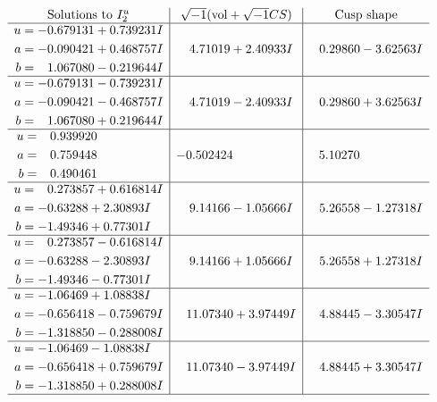 \documentclass[1p]{elsarticle_modified}
\theoremstyle{definition}
\newcommand{\I}{\sqrt{-1}}
\begin{document}
$$\begin{array}{c|c|c}  
\text{Solutions to }I^u_{2}& \I (\text{vol} + \sqrt{-1}CS) & \text{Cusp shape}\\
 \hline 
\begin{aligned}
u &= -0.679131 + 0.739231 I \\
a &= -0.090421 + 0.468757 I \\
b &= \phantom{-}1.067080 - 0.219644 I\end{aligned}
 & \phantom{-}4.71019 + 2.40933 I & \phantom{-}0.29860 - 3.62563 I \\ \hline\begin{aligned}
u &= -0.679131 - 0.739231 I \\
a &= -0.090421 - 0.468757 I \\
b &= \phantom{-}1.067080 + 0.219644 I\end{aligned}
 & \phantom{-}4.71019 - 2.40933 I & \phantom{-}0.29860 + 3.62563 I \\ \hline\begin{aligned}
u &= \phantom{-}0.939920\phantom{ +0.000000I} \\
a &= \phantom{-}0.759448\phantom{ +0.000000I} \\
b &= \phantom{-}0.490461\phantom{ +0.000000I}\end{aligned}
 & -0.502424\phantom{ +0.000000I} & \phantom{-}5.10270\phantom{ +0.000000I} \\ \hline\begin{aligned}
u &= \phantom{-}0.273857 + 0.616814 I \\
a &= -0.63288 + 2.30893 I \\
b &= -1.49346 + 0.77301 I\end{aligned}
 & \phantom{-}9.14166 - 1.05666 I & \phantom{-}5.26558 - 1.27318 I \\ \hline\begin{aligned}
u &= \phantom{-}0.273857 - 0.616814 I \\
a &= -0.63288 - 2.30893 I \\
b &= -1.49346 - 0.77301 I\end{aligned}
 & \phantom{-}9.14166 + 1.05666 I & \phantom{-}5.26558 + 1.27318 I \\ \hline\begin{aligned}
u &= -1.06469 + 1.08838 I \\
a &= -0.656418 - 0.759679 I \\
b &= -1.318850 - 0.288008 I\end{aligned}
 & \phantom{-}11.07340 + 3.97449 I & \phantom{-}4.88445 - 3.30547 I \\ \hline\begin{aligned}
u &= -1.06469 - 1.08838 I \\
a &= -0.656418 + 0.759679 I \\
b &= -1.318850 + 0.288008 I\end{aligned}
 & \phantom{-}11.07340 - 3.97449 I & \phantom{-}4.88445 + 3.30547 I\\
 \hline 
 \end{array}$$\newpage
\end{document}
